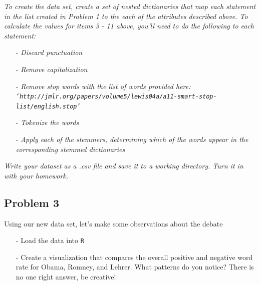 \documentclass[12pt,letterpaper]{article}
\begin{document}
\noindent \textit{To create the data set, create a set of nested dictionaries that map each statement in the list created in Problem 1 to the each of the attributes described above. To  calculate the values for items 3 - 11 above, you'll need to do the following to each statement:}
\begin{itemize}
\item[-]  \textit{Discard punctuation}
\item[-]  \textit{Remove capitalization}
\item[-]  \textit{Remove stop words with the list of words provided here: \\
{\tt `http://jmlr.org/papers/volume5/lewis04a/a11-smart-stop-list/english.stop'}}
\item[-]  \textit{Tokenize the words}
\item[-] \textit{Apply each of the stemmers, determining which of the words appear in the corresponding stemmed dictionaries}
\end{itemize}

\noindent \textit{Write your dataset as a .csv file and save it to a working directory. Turn it in with your homework.}



\subsection*{Problem 3}

Using our new data set, let's make some observations about the debate
\begin{itemize}
\item[-] Load the data into {\tt R}
\end{itemize}



\begin{itemize}
\item[-] Create a visualization that compares the overall positive and negative word rate for Obama, Romney, and Lehrer.  What patterns do you notice?  There is no one right answer, be creative!
\end{itemize}


\end{document}
